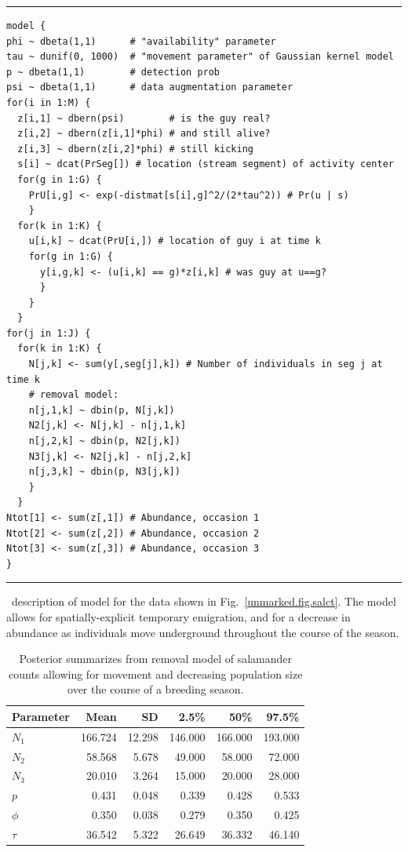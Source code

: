 \begin{panel}
\centering
\rule[0.05in]{\textwidth}{.03in}
\begin{small}
\begin{verbatim}
model {
phi ~ dbeta(1,1)      # "availability" parameter
tau ~ dunif(0, 1000)  # "movement parameter" of Gaussian kernel model
p ~ dbeta(1,1)        # detection prob
psi ~ dbeta(1,1)      # data augmentation parameter
for(i in 1:M) {
  z[i,1] ~ dbern(psi)        # is the guy real?
  z[i,2] ~ dbern(z[i,1]*phi) # and still alive?
  z[i,3] ~ dbern(z[i,2]*phi) # still kicking
  s[i] ~ dcat(PrSeg[]) # location (stream segment) of activity center
  for(g in 1:G) {
    PrU[i,g] <- exp(-distmat[s[i],g]^2/(2*tau^2)) # Pr(u | s)
    }
  for(k in 1:K) {
    u[i,k] ~ dcat(PrU[i,]) # location of guy i at time k
    for(g in 1:G) {
      y[i,g,k] <- (u[i,k] == g)*z[i,k] # was guy at u==g?
      }
    }
  }
for(j in 1:J) {
  for(k in 1:K) {
    N[j,k] <- sum(y[,seg[j],k]) # Number of individuals in seg j at time k
    # removal model:
    n[j,1,k] ~ dbin(p, N[j,k])
    N2[j,k] <- N[j,k] - n[j,1,k]
    n[j,2,k] ~ dbin(p, N2[j,k])
    N3[j,k] <- N2[j,k] - n[j,2,k]
    n[j,3,k] ~ dbin(p, N3[j,k])
    }
  }
Ntot[1] <- sum(z[,1]) # Abundance, occasion 1
Ntot[2] <- sum(z[,2]) # Abundance, occasion 2
Ntot[3] <- sum(z[,3]) # Abundance, occasion 3
}
\end{verbatim}
\end{small}
\rule[0.05in]{\textwidth}{.03in}
\caption{\bugs~description of model for the data shown in
  Fig.~\ref{unmarked.fig.salct}. The model allows for
  spatially-explicit temporary emigration, and for a decrease in
  abundance as individuals move underground throughout the course of
  the season.}
\label{unmarked.panel.sal}
\end{panel}





\begin{table}
  \centering
  \caption{Posterior summarizes from removal model of salamander
    counts allowing for movement and decreasing population size over
    the course of a breeding season.}
  \begin{tabular}{lrrrrr}
    \hline
    Parameter & Mean & SD & 2.5\% & 50\% & 97.5\% \\
    \hline
    $N_1$  & 166.724 &  12.298 & 146.000 & 166.000 & 193.000\\
    $N_2$  &  58.568 &   5.678 &  49.000 &  58.000 &  72.000\\
    $N_3$  &  20.010 &   3.264 &  15.000 &  20.000 &  28.000\\
    $p$    &   0.431 &   0.048 &   0.339 &   0.428 &   0.533\\
    $\phi$ &   0.350 &   0.038 &   0.279 &   0.350 &   0.425\\
    $\tau$ &  36.542 &   5.322 &  26.649 &  36.332 &  46.140\\
    \hline
  \end{tabular}
\end{table}


